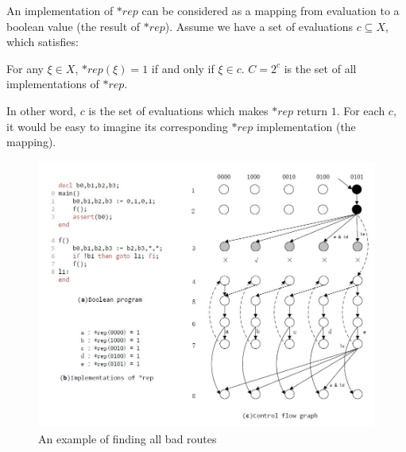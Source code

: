 An implementation of $*rep$ can be considered as a mapping from evaluation to a boolean value (the result of $*rep$). Assume we have a set of evaluations $c \subseteq X$, which satisfies:
\begin{definition}
For any $\xi \in X$, $*rep(\xi) = 1$ if and only if $\xi \in c$. $C = 2^{c}$ is the set of all implementations of $*rep$.
\end{definition}
In other word, $c$ is the set of evaluations which makes $*rep$ return $1$. For each $c$, it would be easy to imagine its corresponding $*rep$ implementation (the mapping).

\begin{figure}
\centering
\includegraphics[width=5in,height=3.5in]{img/Fig3-2.jpg}
\caption{An example of finding all bad routes}
\label{fig:FBR}
\end{figure}

